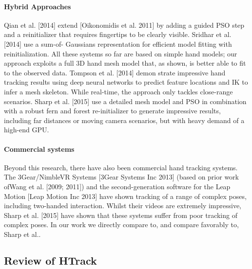 \begin{DRAFT}
\paragraph{Hybrid Approaches} 
Qian et al. [2014] extend [Oikonomidis et al. 2011] by adding a guided PSO step and a reinitializer that requires fingertips to be clearly visible. Sridhar et al. [2014] use a sum-of- Gaussians representation for efficient model fitting with reinitialization. All these systems so far are based on simple hand models; our approach exploits a full 3D hand mesh model that, as shown, is better able to fit to the observed data. Tompson et al. [2014] demon strate impressive hand tracking results using deep neural networks to predict feature locations and IK to infer a mesh skeleton. While real-time, the approach only tackles close-range scenarios. Sharp et al. [2015] use a detailed mesh model and PSO in combination with a robust fern and forest re-initializer to generate impressive results, including far distances or moving camera scenarios, but with heavy demand of a high-end GPU.

\paragraph{Commercial systems} 
Beyond this research, there have also been commercial hand tracking systems. The 3Gear/NimbleVR Systems [3Gear Systems Inc 2013] (based on prior work ofWang et al. [2009; 2011]) and the second-generation software for the Leap Motion [Leap Motion Inc 2013] have shown tracking of a range of complex poses, including two-handed interaction. Whilst their videos are extremely impressive, Sharp et al. [2015] have shown that these systems suffer from poor tracking of complex poses. In our work we directly compare to, and compare favorably to, Sharp et al..
\end{DRAFT}


\subsection{Review of HTrack}


\endinput

